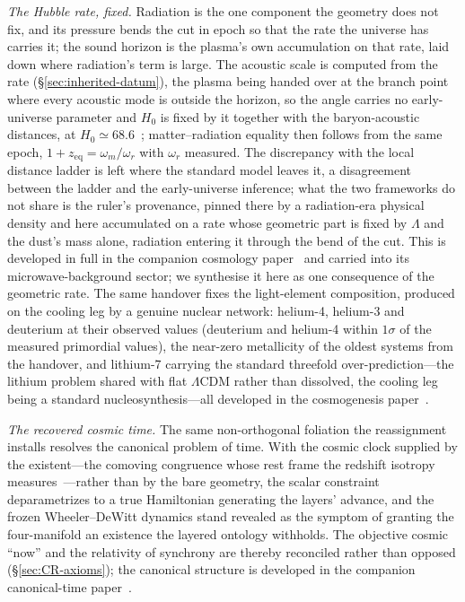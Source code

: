 \documentclass[11pt,a4paper]{article}
\theoremstyle{plain}
\theoremstyle{definition}
\theoremstyle{remark}
\begin{document}
\emph{The Hubble rate, fixed.} Radiation is the one component the geometry does not fix, and its pressure bends the cut in epoch so that the rate the universe has carries it; the sound horizon is the plasma's own accumulation on that rate, laid down where radiation's term is large. The acoustic scale is computed from the rate (\S\ref{sec:inherited-datum}), the plasma being handed over at the branch point where every acoustic mode is outside the horizon, so the angle carries no early-universe parameter and $H_0$ is fixed by it together with the baryon-acoustic distances, at $H_0\simeq68.6$~\cite{JanzenCRcosmology}; matter--radiation equality then follows from the same epoch, $1+z_{\mathrm{eq}}=\omega_m/\omega_r$ with $\omega_r$ measured. The discrepancy with the local distance ladder is left where the standard model leaves it, a disagreement between the ladder and the early-universe inference; what the two frameworks do not share is the ruler's provenance, pinned there by a radiation-era physical density and here accumulated on a rate whose geometric part is fixed by $\Lambda$ and the dust's mass alone, radiation entering it through the bend of the cut. This is developed in full in the companion cosmology paper~\cite{JanzenCRcosmology} and carried into its microwave-background sector; we synthesise it here as one consequence of the geometric rate. The same handover fixes the light-element composition, produced on the cooling leg by a genuine nuclear network: helium-4, helium-3 and deuterium at their observed values (deuterium and helium-4 within $1\sigma$ of the measured primordial values), the near-zero metallicity of the oldest systems from the handover, and lithium-7 carrying the standard threefold over-prediction---the lithium problem shared with flat $\Lambda$CDM rather than dissolved, the cooling leg being a standard nucleosynthesis---all developed in the cosmogenesis paper~\cite{JanzenCosmogenesis}.

\emph{The recovered cosmic time.} The same non-orthogonal foliation the reassignment installs resolves the canonical problem of time. With the cosmic clock supplied by the existent---the comoving congruence whose rest frame the redshift isotropy measures~\cite{JanzenModernParallax}---rather than by the bare geometry, the scalar constraint deparametrizes to a true Hamiltonian generating the layers' advance, and the frozen Wheeler--DeWitt dynamics stand revealed as the symptom of granting the four-manifold an existence the layered ontology withholds. The objective cosmic ``now'' and the relativity of synchrony are thereby reconciled rather than opposed (\S\ref{sec:CR-axioms}); the canonical structure is developed in the companion canonical-time paper~\cite{JanzenCanonicalTime}.
\end{document}
